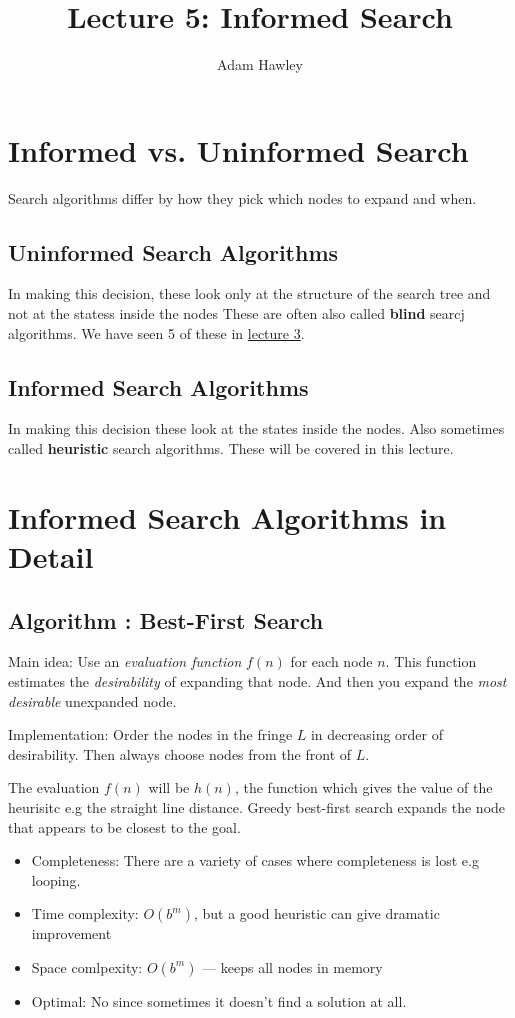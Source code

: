 \documentclass{article}
\author{Adam Hawley}
\title{Lecture 5: Informed Search}
\begin{document}
\maketitle

\section{Informed vs. Uninformed Search}
Search algorithms differ by how they pick which nodes to expand and when.

\subsection{Uninformed Search Algorithms}
In making this decision, these look only at the structure of the search tree and not at the statess inside the nodes
These are often also called \textbf{blind} searcj algorithms.
We have seen 5 of these in \href{3.pdf}{lecture 3}.

\subsection{Informed Search Algorithms}
In making this decision these look at the states inside the nodes.
Also sometimes called \textbf{heuristic} search algorithms.
These will be covered in this lecture.

\section{Informed Search Algorithms in Detail}
\subsection{Algorithm : Best-First Search}
Main idea: Use an \textit{evaluation function} $f(n)$ for each node $n$.
This function estimates the \textit{desirability} of expanding that node.
And then you expand the \textit{most desirable} unexpanded node.

Implementation:
Order the nodes in the fringe $L$ in decreasing order of desirability.
Then always choose nodes from the front of $L$.

The evaluation $f(n)$ will be $h(n)$, the function which gives the value of the heurisitc e.g the straight line distance.
Greedy best-first search expands the node that appears to be closest to the goal.

\begin{itemize}
	\item Completeness:
		There are a variety of cases where completeness is lost e.g looping.
	\item Time complexity:
		$O(b^m)$, but a good heuristic can give dramatic improvement
	\item Space comlpexity:
		$O(b^m)$ --- keeps all nodes in memory
	\item Optimal:
		No since sometimes it doesn't find a solution at all.
\end{itemize}
\end{document}
